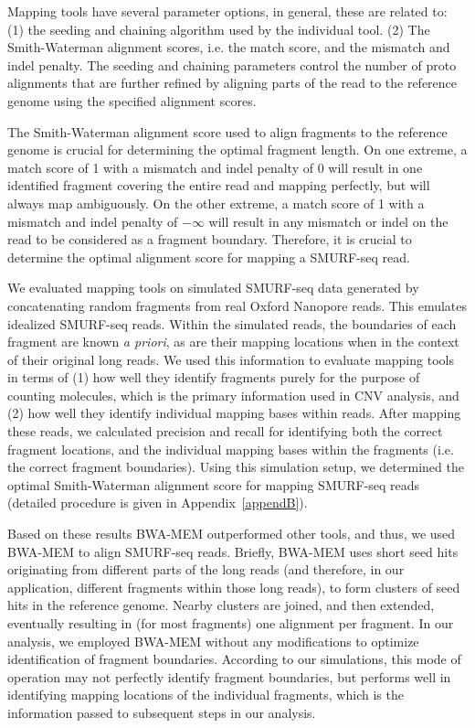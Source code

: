 Mapping tools have several parameter options, in general, these are
related to: (1) the seeding and chaining algorithm used by the
individual tool.  (2) The Smith-Waterman alignment scores, i.e. the
match score, and the mismatch and indel penalty. The seeding and
chaining parameters control the number of proto alignments that are
further refined by aligning parts of the read to the reference genome
using the specified alignment scores.

The Smith-Waterman alignment score used to align fragments to the
reference genome is crucial for determining the optimal fragment length.
On one extreme, a match score of 1 with a mismatch and indel penalty of
0 will result in one identified fragment covering the entire read and
mapping perfectly, but will always map ambiguously. On the other
extreme, a match score of 1 with a mismatch and indel penalty of
$-\infty$ will result in any mismatch or indel on the read to be
considered as a fragment boundary. Therefore, it is crucial to determine
the optimal alignment score for mapping a SMURF-seq read.

We evaluated mapping tools on simulated SMURF-seq data generated by
concatenating random fragments from real Oxford Nanopore reads. This
emulates idealized SMURF-seq reads. Within the simulated reads, the
boundaries of each fragment are known \textit{a priori}, as are their
mapping locations when in the context of their original long reads. We
used this information to evaluate mapping tools in terms of (1) how well
they identify fragments purely for the purpose of counting molecules,
which is the primary information used in CNV analysis, and (2) how well
they identify individual mapping bases within reads. After mapping these
reads, we calculated precision and recall for identifying both the
correct fragment locations, and the individual mapping bases within the
fragments (i.e. the correct fragment boundaries). Using this simulation
setup, we determined the optimal Smith-Waterman alignment score for
mapping SMURF-seq reads (detailed procedure is given in
Appendix~\ref{appendB}).

Based on these results BWA-MEM outperformed other tools, and thus, we
used BWA-MEM to align SMURF-seq reads.
%
Briefly, BWA-MEM uses short seed hits originating from different parts of
the long reads (and therefore, in our application, different fragments
within those long reads), to form clusters of seed hits in the reference
genome. Nearby clusters are joined, and then extended, eventually
resulting in (for most fragments) one alignment per fragment.
%
In our analysis, we employed BWA-MEM without any modifications to
optimize identification of fragment boundaries.  According to our
simulations, this mode of operation may not perfectly identify fragment
boundaries, but performs well in identifying mapping locations of
the individual fragments, which is the information passed to subsequent
steps in our analysis.


